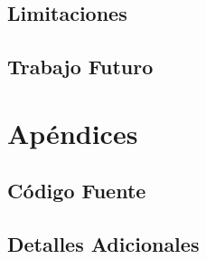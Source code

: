 \documentclass[a4paper,12pt]{report}
\begin{document}
    \section{Limitaciones}
    \section{Trabajo Futuro}

\appendix
\chapter{Apéndices}
\section{Código Fuente}
\section{Detalles Adicionales}





\end{document}
